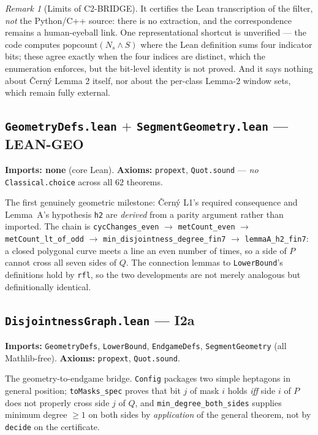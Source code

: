 \documentclass[11pt,a4paper]{article}
\theoremstyle{plain}
\theoremstyle{definition}
\theoremstyle{remark}
\newtheorem*{remark}{Remark}
\begin{document}
\begin{remark}[Limits of \textsf{C2-BRIDGE}]
It certifies the Lean transcription of the filter, \emph{not} the Python/C++
source: there is no extraction, and the correspondence remains a human-eyeball
link. One representational shortcut is unverified --- the code computes
$\mathrm{popcount}(N_s\wedge S)$ where the Lean definition sums four indicator
bits; these agree exactly when the four indices are distinct, which the
enumeration enforces, but the bit-level identity is not proved. And it says
nothing about {\v C}ern{\'y} Lemma 2 itself, nor about the per-class Lemma-2
window sets, which remain fully external.
\end{remark}

\subsection*{\texttt{GeometryDefs.lean} $+$ \texttt{SegmentGeometry.lean} --- \textsf{LEAN-GEO}}
\textbf{Imports: none} (core Lean). \textbf{Axioms:} \texttt{propext},
\texttt{Quot.sound} --- \emph{no} \texttt{Classical.choice} across all
$62$ theorems.

The first genuinely geometric milestone: {\v C}ern{\'y} L1's required
consequence and Lemma~A's hypothesis \texttt{h2} are \emph{derived} from a
parity argument rather than imported. The chain is
\texttt{cycChanges\_even} $\to$ \texttt{metCount\_even} $\to$
\texttt{metCount\_lt\_of\_odd} $\to$ \texttt{min\_disjointness\_degree\_fin7}
$\to$ \texttt{lemmaA\_h2\_fin7}: a closed polygonal curve meets a line an even
number of times, so a side of $P$ cannot cross all seven sides of $Q$. The
connection lemmas to \texttt{LowerBound}'s definitions hold by
\texttt{rfl}, so the two developments are not merely analogous but
definitionally identical.

\subsection*{\texttt{DisjointnessGraph.lean} --- \textsf{I2a}}
\textbf{Imports:} \texttt{GeometryDefs}, \texttt{LowerBound},
\texttt{EndgameDefs}, \texttt{SegmentGeometry} (all Mathlib-free).
\textbf{Axioms:} \texttt{propext}, \texttt{Quot.sound}.

The geometry-to-endgame bridge. \texttt{Config} packages two simple heptagons in
general position; \texttt{toMasks\_spec} proves that bit $j$ of mask $i$ holds
\emph{iff} side $i$ of $P$ does not properly cross side $j$ of $Q$, and
\texttt{min\_degree\_both\_sides} supplies minimum degree $\ge 1$ on both sides
by \emph{application} of the general theorem, not by \texttt{decide} on the
certificate.
\end{document}

